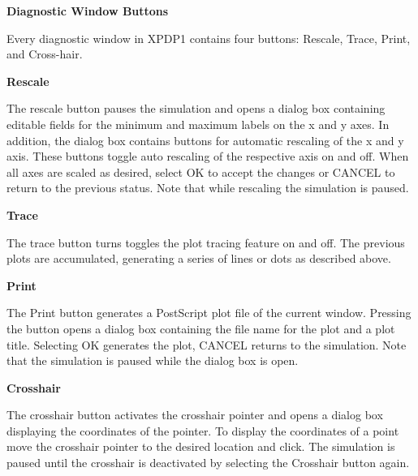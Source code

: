 \begin{section}
\begin{subsection}
{\bf Diagnostic Window Buttons}

Every diagnostic window in XPDP1 contains four buttons: Rescale, 
Trace, Print, and Cross-hair.

\begin{subsubsection}	%
{\bf Rescale}

      The rescale button pauses the simulation and opens a dialog box
      containing editable fields for the minimum and maximum labels on the x
      and y axes.  In addition, the dialog box contains buttons for automatic
      rescaling of the x and y axis.  These buttons toggle auto rescaling of the
      respective axis on and off.  When all axes are scaled as desired, select
      OK to accept the changes or CANCEL to return to the previous status.
      Note that while rescaling the simulation is paused.
\end{subsubsection}	%

\begin{subsubsection}	%
{\bf Trace}

      The trace button turns toggles the plot tracing feature on and off.  The
      previous plots are accumulated, generating a series of lines or dots as
      described above.
\end{subsubsection}	%

\begin{subsubsection}	%
{\bf Print}

      The Print button generates a PostScript plot file of the current window.
      Pressing the button opens a dialog box containing the file name for the
      plot and a plot title.  Selecting OK generates the plot, CANCEL returns
      to the simulation.  Note that the simulation is paused while the dialog
      box is open.
\end{subsubsection}	%

\begin{subsubsection}	%
{\bf Crosshair}		

      The crosshair button activates the crosshair pointer and opens a dialog
      box displaying the coordinates of the pointer.  To display the
      coordinates of a point move the crosshair pointer to the desired location
      and click.  The simulation is paused until the crosshair is deactivated
      by selecting the Crosshair button again.
\end{subsubsection}	%


\end{subsection}
\end{section}
